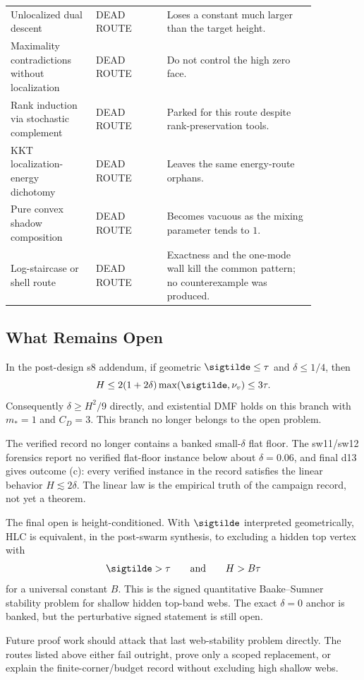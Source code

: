 \begin{longtable}{p{0.24\linewidth}p{0.20\linewidth}p{0.42\linewidth}}
Unlocalized dual descent & DEAD ROUTE & Loses a constant much larger than the target height. \\
Maximality contradictions without localization & DEAD ROUTE & Do not control the high zero face. \\
Rank induction via stochastic complement & DEAD ROUTE & Parked for this route despite rank-preservation tools. \\
KKT localization-energy dichotomy & DEAD ROUTE & Leaves the same energy-route orphans. \\
Pure convex shadow composition & DEAD ROUTE & Becomes vacuous as the mixing parameter tends to \(1\). \\
Log-staircase or shell route & DEAD ROUTE & Exactness and the one-mode wall kill the common pattern; no counterexample was produced. \\
\bottomrule
\end{longtable}

\subsection{What Remains Open}

\begin{proposition}
\provedbadge In the post-design s8 addendum, if geometric \(\sigtilde\le\tau\) and
\(\delta\le1/4\), then
\[
  H\le 2(1+2\delta)\max(\sigtilde,\nu_v)\le 3\tau .
\]
Consequently \(\delta\ge H^2/9\) directly, and existential DMF holds on this branch with
\(m_*=1\) and \(C_D=3\).  This branch no longer belongs to the open problem.
\end{proposition}

\begin{numericalresult}
\numbadge The verified record no longer contains a banked small-\(\delta\) flat floor.
The sw11/sw12 forensics report no verified flat-floor instance below about
\(\delta=0.06\), and final d13 gives outcome (c): every verified instance in the record
satisfies the linear behavior \(H\lesssim 2\delta\).  The linear law is the empirical
truth of the campaign record, not yet a theorem.
\end{numericalresult}

\begin{openproblem}
\openbadge The final open is height-conditioned.  With \(\sigtilde\) interpreted
geometrically, HLC is equivalent, in the post-swarm synthesis, to excluding a hidden top
vertex with
\[
  \sigtilde>\tau
  \qquad\text{and}\qquad
  H>B\tau
\]
for a universal constant \(B\).  This is the signed quantitative Baake--Sumner stability
problem for shallow hidden top-band webs.  The exact \(\delta=0\) anchor is banked, but
the perturbative signed statement is still open.
\end{openproblem}

Future proof work should attack that last web-stability problem directly.  The routes
listed above either fail outright, prove only a scoped replacement, or explain the
finite-corner/budget record without excluding high shallow webs.
